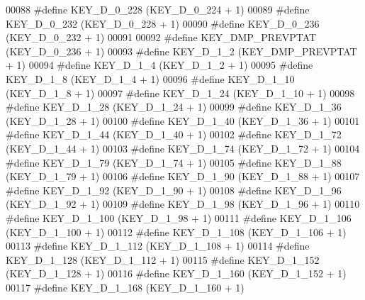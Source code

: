 \begin{DoxyCode}
00088 \textcolor{preprocessor}{#define KEY\_D\_0\_228                 (KEY\_D\_0\_224 + 1)}
00089 \textcolor{preprocessor}{#define KEY\_D\_0\_232                 (KEY\_D\_0\_228 + 1)}
00090 \textcolor{preprocessor}{#define KEY\_D\_0\_236                 (KEY\_D\_0\_232 + 1)}
00091 
00092 \textcolor{preprocessor}{#define KEY\_DMP\_PREVPTAT            (KEY\_D\_0\_236 + 1)}
00093 \textcolor{preprocessor}{#define KEY\_D\_1\_2                   (KEY\_DMP\_PREVPTAT + 1)}
00094 \textcolor{preprocessor}{#define KEY\_D\_1\_4                   (KEY\_D\_1\_2 + 1)}
00095 \textcolor{preprocessor}{#define KEY\_D\_1\_8                   (KEY\_D\_1\_4 + 1)}
00096 \textcolor{preprocessor}{#define KEY\_D\_1\_10                  (KEY\_D\_1\_8 + 1)}
00097 \textcolor{preprocessor}{#define KEY\_D\_1\_24                  (KEY\_D\_1\_10 + 1)}
00098 \textcolor{preprocessor}{#define KEY\_D\_1\_28                  (KEY\_D\_1\_24 + 1)}
00099 \textcolor{preprocessor}{#define KEY\_D\_1\_36                  (KEY\_D\_1\_28 + 1)}
00100 \textcolor{preprocessor}{#define KEY\_D\_1\_40                  (KEY\_D\_1\_36 + 1)}
00101 \textcolor{preprocessor}{#define KEY\_D\_1\_44                  (KEY\_D\_1\_40 + 1)}
00102 \textcolor{preprocessor}{#define KEY\_D\_1\_72                  (KEY\_D\_1\_44 + 1)}
00103 \textcolor{preprocessor}{#define KEY\_D\_1\_74                  (KEY\_D\_1\_72 + 1)}
00104 \textcolor{preprocessor}{#define KEY\_D\_1\_79                  (KEY\_D\_1\_74 + 1)}
00105 \textcolor{preprocessor}{#define KEY\_D\_1\_88                  (KEY\_D\_1\_79 + 1)}
00106 \textcolor{preprocessor}{#define KEY\_D\_1\_90                  (KEY\_D\_1\_88 + 1)}
00107 \textcolor{preprocessor}{#define KEY\_D\_1\_92                  (KEY\_D\_1\_90 + 1)}
00108 \textcolor{preprocessor}{#define KEY\_D\_1\_96                  (KEY\_D\_1\_92 + 1)}
00109 \textcolor{preprocessor}{#define KEY\_D\_1\_98                  (KEY\_D\_1\_96 + 1)}
00110 \textcolor{preprocessor}{#define KEY\_D\_1\_100                 (KEY\_D\_1\_98 + 1)}
00111 \textcolor{preprocessor}{#define KEY\_D\_1\_106                 (KEY\_D\_1\_100 + 1)}
00112 \textcolor{preprocessor}{#define KEY\_D\_1\_108                 (KEY\_D\_1\_106 + 1)}
00113 \textcolor{preprocessor}{#define KEY\_D\_1\_112                 (KEY\_D\_1\_108 + 1)}
00114 \textcolor{preprocessor}{#define KEY\_D\_1\_128                 (KEY\_D\_1\_112 + 1)}
00115 \textcolor{preprocessor}{#define KEY\_D\_1\_152                 (KEY\_D\_1\_128 + 1)}
00116 \textcolor{preprocessor}{#define KEY\_D\_1\_160                 (KEY\_D\_1\_152 + 1)}
00117 \textcolor{preprocessor}{#define KEY\_D\_1\_168                 (KEY\_D\_1\_160 + 1)}

\end{DoxyCode}

